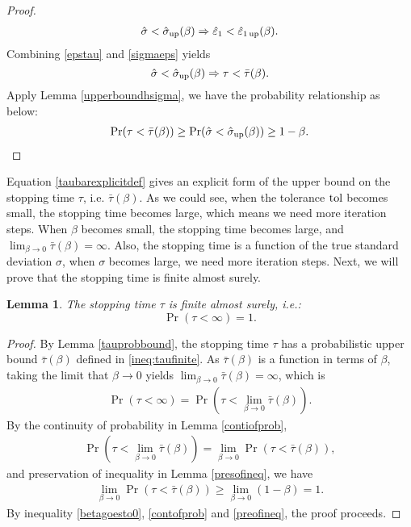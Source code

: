 \documentclass{iitthesis}
\newtheorem{lemma}[theorem]{Lemma}
\theoremstyle{definition}
\begin{document}
\begin{proof}
\begin{align}\label{sigmaeps}
 \hat{\sigma} < \hat{\sigma}_{\operatorname{up}}(\beta) \Rightarrow \hat{\varepsilon}_1 < \hat{\varepsilon}_{1\operatorname{up}}(\beta).
\end{align}
Combining \eqref{epstau} and \eqref{sigmaeps} yields
$$\hat{\sigma} < \hat{\sigma}_{\operatorname{up}}(\beta) \Rightarrow\tau <\bar{\tau}(\beta).$$
Apply Lemma \ref{upperboundhsigma}, we have the probability relationship as below: 
\begin{align*}
\Pr(\tau < \bar{\tau}(\beta)) \geq  \Pr(\hat{\sigma} < \hat{\sigma}_{\operatorname{up}}(\beta)) \geq 1-\beta.
\end{align*}
\end{proof}
Equation \ref{taubarexplicitdef} gives an explicit form of the upper bound on the stopping time $\tau$, i.e. $\bar{\tau}(\beta)$. As we could see, when the tolerance $\operatorname{tol}$ becomes small, the stopping time becomes large, which means we need more iteration steps. When $\beta$ becomes small, the stopping time becomes large, and $\lim_{\beta \to 0}\bar{\tau}(\beta) = \infty$. Also, the stopping time is a function of the true standard deviation $\sigma$, when $\sigma$ becomes large, we need more iteration steps. Next, we will prove that the stopping time is finite almost surely.
\begin{lemma}\label{taufinite}
The stopping time $\tau$ is finite almost surely, i.e.:
$$\Pr(\tau < \infty) = 1.$$
\end{lemma}
\begin{proof}
By Lemma \ref{tauprobbound}, the stopping time $\tau$ has a probabilistic upper bound $\bar{\tau}(\beta)$ defined in \eqref{ineq:taufinite}. As $\bar{\tau}(\beta)$ is a function in terms of $\beta$, taking the limit that $\beta \to 0$ yields $\lim_{\beta \to 0} \bar{\tau}(\beta) = \infty$, which is
\begin{align}\label{betagoesto0}
\Pr(\tau < \infty) = \Pr(\tau  <\lim_{\beta \to 0}\bar{\tau}(\beta)).
\end{align}
By the continuity of probability in Lemma \ref{contiofprob}, 
\begin{align}\label{contofprob}
 \Pr(\tau  <\lim_{\beta \to 0}\bar{\tau}(\beta)) =\lim_{\beta \to 0} \Pr(\tau  <\bar{\tau}(\beta)),
\end{align}
and preservation of inequality in Lemma \ref{presofineq}, we have
\begin{align}\label{preofineq}
\lim_{\beta \to 0} \Pr(\tau  <\bar{\tau}(\beta)) 
\geq \lim_{\beta \to 0}(1-\beta) = 1.
\end{align}
By inequality \eqref{betagoesto0}, \eqref{contofprob} and \eqref{preofineq}, the proof proceeds.
\end{proof}
\end{document}
